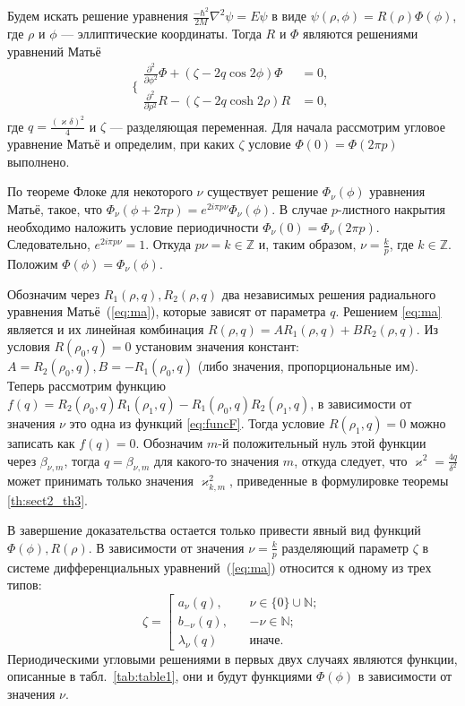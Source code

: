 Будем искать решение уравнения $\frac{-\hbar^2}{2M} \nabla^2\psi = E\psi$  в виде  $\psi(\rho, \phi)=R(\rho)\Phi(\phi)$, где  $\rho$ и $\phi$ --- эллиптические координаты.
Тогда $R$ и $\Phi$ являются решениями уравнений Матьё
\begin{equation}
	\Bigg\{
	\begin{array}{ccc}
		\frac{\partial^2}{\partial \phi^2}\Phi + (\zeta - 2q\cos{2\phi})\Phi & = 0, \\
		\frac{\partial^2}{\partial \rho^2}R - (\zeta - 2q\cosh{2\rho})R &= 0,
	\end{array}
\label{eq:ma}
\end{equation}
где
$q=\frac{(\varkappa \delta)^2}{4}$ и 
$\zeta$ --- разделяющая переменная. Для начала рассмотрим угловое уравнение Матьё и определим, при каких $\zeta$ условие $\Phi(0)=\Phi(2\pi p)$ выполнено.

По теореме Флоке для некоторого $\nu$ существует решение $\Phi_\nu(\phi)$ уравнения Матьё, такое, что $\Phi_\nu(\phi+2\pi p) =e^{2 i \pi p \nu}\Phi_\nu(\phi)$. В случае $p$-листного накрытия необходимо наложить условие периодичности $\Phi_\nu(0) = \Phi_\nu(2 \pi p)$. Следовательно, $e^{2 i \pi p \nu} = 1$. Откуда $ p \nu = k \in \mathbb{Z}$ и, таким образом, $ \nu = \frac{k}{p}$, где $k \in \mathbb{Z}$. 
Положим $\Phi(\phi) = \Phi_\nu(\phi)$.

Обозначим через $R_1(\rho, q), R_2(\rho, q)$ два независимых решения радиального уравнения Матьё~(\ref{eq:ma}), которые зависят от параметра $q$. Решением \eqref{eq:ma} является и их линейная комбинация $R(\rho, q) = A R_1(\rho, q) + B R_2(\rho, q)$. Из условия $R(\rho_0, q)=0$ установим значения констант: $A=R_2(\rho_0, q), B=-R_1(\rho_0, q)$ (либо значения, пропорциональные им). 
Теперь рассмотрим функцию $f(q) = R_2(\rho_0, q) R_1(\rho_1, q) -R_1(\rho_0, q) R_2(\rho_1, q)$, в зависимости от значения $\nu$ это одна из функций \eqref{eq:funcF}. Тогда условие $R(\rho_1, q)=0$ можно записать как $f(q)=0$. Обозначим $m$-й положительный нуль этой функции через $\beta_{\nu, m}$, тогда $q=\beta_{\nu, m}$ для какого-то значения $m$, откуда следует, что $\varkappa^2 = \frac{4q}{\delta^2}$ может принимать только значения $\varkappa^2_{k,m}$, приведенные в формулировке теоремы \ref{th:sect2_th3}.

В завершение доказательства остается только привести явный вид функций $\Phi(\phi), R(\rho)$. В зависимости от значения $\nu=\frac{k}{p}$ разделяющий параметр $\zeta$ в системе дифференциальных уравнений~(\ref{eq:ma}) относится к одному из трех типов:
\[
\zeta = \left[
\begin{array}{ll}
	a_\nu(q), 					& \nu \in \{0\} \cup \mathbb{N}; \\
    b_{-\nu}(q), 	\ \ \ \			& -\nu \in \mathbb{N}; \\
	\lambda_\nu(q) 	        & \text{иначе}.
\end{array}
\right.
\]
Периодическими угловыми решениями в первых двух случаях являются функции, описанные в табл.~\ref{tab:table1}, они и будут функциями $\Phi(\phi)$ в зависимости от значения $\nu$.

